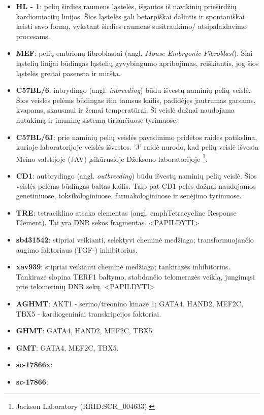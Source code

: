 \documentclass[12pt]{article}
\begin{document}
\begin{itemize}
    \item \textbf{HL - 1}: pelių širdies raumens ląstelės, išgautos
          iš navikinių prieširdžių kardiomiocitų linijos. Šios ląstelės
          gali betarpiškai dalintis ir spontaniškai keisti
          savo formą, vykstant širdies raumens susitraukimo/
          atsipalaidavimo procesams.
    \item \textbf{MEF}: pelių embrionų fibroblastai (angl.
          \emph{Mouse Embryonic Fibroblast}). Šiai ląstelių
          linijai būdingas ląstelių gyvybingumo apribojimas,
          reiškiantis, jog šios ląstelės greitai pasensta ir miršta.
    \item \textbf{C57BL/6}: inbrydingo (angl. \emph{inbreeding}) būdu
          išvestų naminių pelių veislė. Šios veislės pelėms
          būdingas itin tamsus kailis, padidėjęs jautrumas garsams,
          kvapams, skausmui ir žemai temperatūrai. Ši veislė
          dažnai naudojama nutukimą ir imuninę sistemą tiriančiuose
          tyrimuose.
    \item \textbf{C57BL/6J}: prie naminių pelių veislės pavadinimo
          pridėtos raidės patikslina, kurioje laboratorijoje veislės
          išvestos. 'J' raidė nurodo, kad pelių veislė išvesta Meino
          valstijoje (JAV) įsikūrusioje Džeksono laboratorijoje
          \footnote{Jackson Laboratory (RRID:SCR\_004633).}.
    \item \textbf{CD1}: autbrydingo (angl. \emph{outbreeding}) būdu
          išvestų naminių pelių veislė. Šios veislės pelėms
          būdingas baltas kailis. Taip pat CD1 pelės dažnai naudojamos
          genetiniuose, toksikologiniuose, farmakologiniuose ir
          senėjimo tyrimuose.
    \item \textbf{TRE}: tetraciklino atsako elementas (angl. 
          emph{Tetracycline Response Element}). Tai yra DNR sekos
          fragmentas. <PAPILDYTI>
    \item \textbf{sb431542}: stipriai veikianti, selektyvi cheminė
          medžiaga; transformuojančio augimo faktoriaus {\textbeta}
          (TGF-{\textbeta}) inhibitorius.
    \item \textbf{xav939}: stipriai veikianti cheminė medžiaga;
          tankirazės inhibitorius. Tankirazė slopina TERF1 baltymo,
          stabdančio telomerazės veiklą, jungimąsi prie telomerinių
          DNR sekų. <PAPILDYTI>
    \item \textbf{AGHMT}: AKT1 - serino/treonino kinazė 1; GATA4,
          HAND2, MEF2C, TBX5 - kardiogeniniai transkripcijos faktoriai.
    \item \textbf{GHMT}: GATA4, HAND2, MEF2C, TBX5.
    \item \textbf{GMT}: GATA4, MEF2C, TBX5.
    \item \textbf{sc-17866x}:
    \item \textbf{sc-17866}:
\end{itemize}
\end{document}
